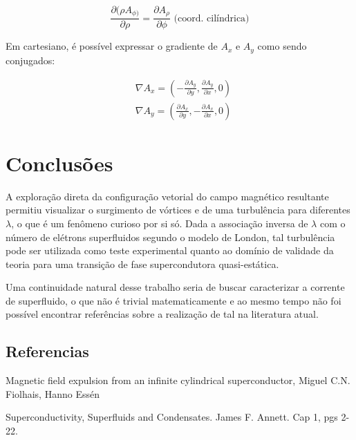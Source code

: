 \documentclass[%
 reprint,
 amsmath,amssymb,
 aps,
]{revtex4-1}
\begin{document}
\begin{equation}
    \label{eq:superfluido_campo}
    \frac{\partial (\rho A_{\phi)}}{\partial {\rho}} = \frac{\partial A_{\rho}}{\partial \phi} 
     \mbox{ (coord. cilíndrica)}
\end{equation}

Em cartesiano, é possível expressar o gradiente de $A_x$ e $A_y$ como sendo conjugados:

\begin{equation}
    \begin{split}
    &\nabla A_x = (-\frac{\partial A_y}{\partial y}, \frac{\partial A_y}{\partial x}, 0) \\
    &\nabla A_y = (\frac{\partial A_x}{\partial y}, -\frac{\partial A_x}{\partial x}, 0)
    \end{split}
\end{equation}

\section{Conclusões}


A exploração direta da configuração vetorial do campo magnético resultante permitiu visualizar o surgimento de vórtices e de uma turbulência para diferentes $\lambda$, o que é um fenômeno curioso por si só. Dada a associação inversa de $\lambda$ com o número de elétrons superfluidos segundo o modelo de London, tal turbulência pode ser utilizada como teste experimental quanto ao domínio de validade da teoria para uma transição de fase supercondutora quasi-estática.

Uma continuidade natural desse trabalho seria de buscar caracterizar a corrente de superfluido, o que não é trivial matematicamente e ao mesmo tempo não foi possível encontrar referências sobre a realização de tal na literatura atual.

\begin{thebibliography}{9}

\section{Referencias}

Magnetic field expulsion from an infinite cylindrical superconductor, Miguel C.N. Fiolhais, Hanno Essén

Superconductivity, Superfluids and Condensates. James F. Annett. Cap 1, pgs 2-22.

\end{thebibliography}
\end{document}
